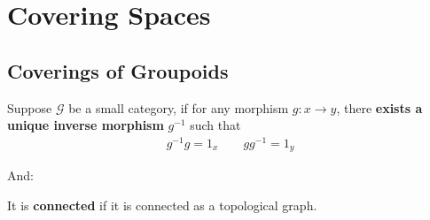 \documentclass[Total.tex]{subfiles}
\begin{document}
	\chapter{Covering Spaces}
		\section{Coverings of Groupoids}
			\begin{Def}
				Suppose $\mathcal{G}$ be a small category, if for any morphism $g:x\rightarrow y$, there \textbf{exists a unique inverse morphism} $g^{-1}$ such that
				\begin{gather*}
					g^{-1}g=1_x\qquad gg^{-1}=1_y
				\end{gather*}
			\end{Def}
			
			And:
			\begin{Def}
				It is \textbf{connected} if it is connected as a topological graph.
			\end{Def}
			
\end{document}
